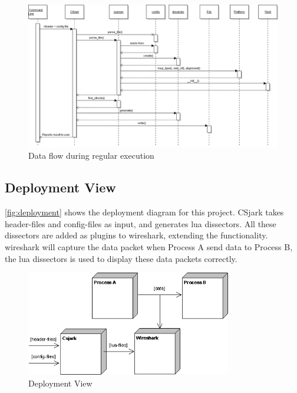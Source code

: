 \begin{figure}[htb]
	\center
	\includegraphics[width = \textwidth]{./evaluation/img/FinalSequenceDiagram}
	\caption{Data flow during regular execution\label{fig:processview}}
\end{figure}


\subsection{Deployment View}

\autoref{fig:deployment} shows the deployment diagram for this project. CSjark 
takes \gls{header}-files and config-files as input, and generates \Gls{lua} 
\glspl{dissector}. All these \glspl{dissector} are added as plugins to 
\Gls{wireshark}, extending the functionality. \Gls{wireshark} will capture the 
data packet when Process A send data to Process B, the \Gls{lua} 
\glspl{dissector} is used to display these data packets correctly.

\begin{figure}[htb]
	\center
	\includegraphics[width = 0.8\textwidth]{./planning/img/Deployment}
	\caption{Deployment View\label{fig:deployment}}
\end{figure}

